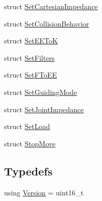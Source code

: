 \begin{DoxyCompactItemize}
struct \hyperlink{structresearch__interface_1_1robot_1_1SetCartesianImpedance}{Set\+Cartesian\+Impedance}
\item 
struct \hyperlink{structresearch__interface_1_1robot_1_1SetCollisionBehavior}{Set\+Collision\+Behavior}
\item 
struct \hyperlink{structresearch__interface_1_1robot_1_1SetEEToK}{Set\+E\+E\+ToK}
\item 
struct \hyperlink{structresearch__interface_1_1robot_1_1SetFilters}{Set\+Filters}
\item 
struct \hyperlink{structresearch__interface_1_1robot_1_1SetFToEE}{Set\+F\+To\+EE}
\item 
struct \hyperlink{structresearch__interface_1_1robot_1_1SetGuidingMode}{Set\+Guiding\+Mode}
\item 
struct \hyperlink{structresearch__interface_1_1robot_1_1SetJointImpedance}{Set\+Joint\+Impedance}
\item 
struct \hyperlink{structresearch__interface_1_1robot_1_1SetLoad}{Set\+Load}
\item 
struct \hyperlink{structresearch__interface_1_1robot_1_1StopMove}{Stop\+Move}
\end{DoxyCompactItemize}
\subsection*{Typedefs}
\begin{DoxyCompactItemize}
\item 
using \hyperlink{namespaceresearch__interface_1_1robot_aa7a53d2c58ee4f7aa706b905ddcc7d47}{Version} = uint16\+\_\+t
\end{DoxyCompactItemize}
